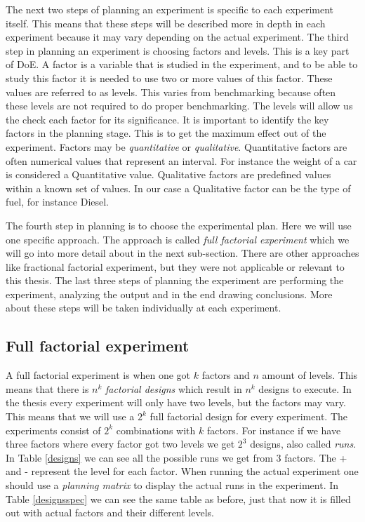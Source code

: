 \documentclass{llncs}
\begin{document}
The next two steps of planning an experiment is specific to each experiment itself. This means 
that these steps will be described more in depth in each experiment because it may vary depending on the actual 
experiment. 
The third step in planning an experiment is choosing factors and levels. This is a key part of 
DoE. A factor is a variable that is studied in the experiment, and to be able to study this factor 
it is needed to use two or more values of this factor. These values are referred to as levels. 
This varies from benchmarking because often these levels are not required to do proper benchmarking. 
The levels will allow us the check each factor for its significance. It is important to 
identify the key factors in the planning stage. This is to get the maximum effect out of the experiment. 
Factors may be \textit{quantitative} or \textit{qualitative}. Quantitative factors are often 
numerical values that represent an interval. For instance the weight of a car is considered a 
Quantitative value. Qualitative factors are predefined values within a known set of values. 
In our case a Qualitative factor can be the type of fuel, for instance Diesel. 

The fourth step in planning is to choose the experimental plan. Here we will use one specific approach. The approach 
is called \textit{full factorial experiment} which we will go into more detail about in the next sub-section. There are other 
approaches like fractional factorial experiment, but they were not applicable or relevant to this thesis. 
The last three steps of planning the experiment are performing the experiment, analyzing the output 
and in the end drawing conclusions. More about these steps will be taken individually at each experiment.~\cite{PlanExp}


\subsection{Full factorial experiment}
A full factorial experiment is when one got $k$ factors and $n$ amount of levels. This means 
that there is $n^k$ \textit{factorial designs} which result in $n^k$ designs to execute. 
In the thesis every experiment will only have two levels, but the factors may vary. This means 
that we will use a $2^k$ full factorial design for every experiment. The experiments consist of $2^k$ combinations 
with $k$ factors. For instance if we have three factors where every factor got two levels 
we get $2^3$ designs, also called \textit{runs}. In Table \ref{designs} we can see all 
the possible runs we get from 3 factors. The + and - represent the level for each factor. 
When running the actual experiment one should use a \textit{planning matrix} to display the actual runs in the 
experiment. In Table \ref{designsspec} we can see the same table as before, just that now it is filled out with 
actual factors and their different levels. 
\end{document}
